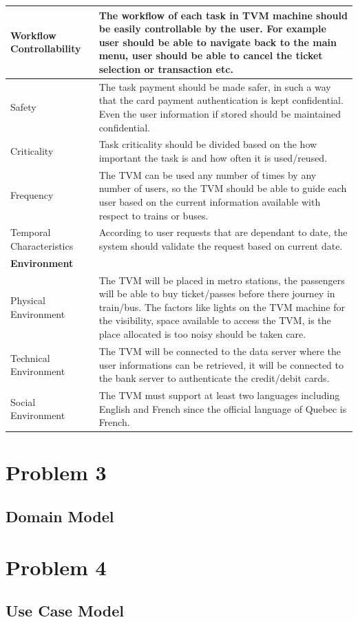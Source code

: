 \documentclass[a4paper,12pt]{report}
\begin{document}
\setlength{\tabcolsep}{18pt}
\renewcommand{\arraystretch}{1.5}
\begin{tabular}{ |p{3cm}|p{12cm}| }
	\hline
	Workflow Controllability & The workflow of each task in TVM machine should be easily controllable by the user. For example user should be able to navigate back to the main menu, user should be able to cancel the ticket selection or transaction etc.\\
	\hline
	Safety & 
	The task payment should be made safer, in such a way that the card payment authentication is kept confidential. Even the user information if stored should be maintained confidential.\\
	\hline
	Criticality & 
	Task criticality should be divided based on the how important the task is and how often it is used/reused.\\
	\hline
	Frequency & 
	The TVM can be used any number of times by any number of users, so the TVM should be able to guide each user based on the current information available with respect to trains or buses.\\
	\hline
	Temporal Characteristics & 
	According to user requests that are dependant to date, the system should validate the request based on current date. \\
	
	\hline
	\textbf{Environment} & \\
	\hline
	Physical Environment & 
	The TVM will be placed in metro stations, the passengers will be able to buy ticket/passes before there journey in train/bus. The factors like lights on the TVM machine for the visibility, space available to access the TVM, is the place allocated is too noisy should be taken care. \\
	\hline
	Technical Environment & 
	The TVM will be connected to the data server where the user informations can be retrieved, it will be connected to the bank server to authenticate the credit/debit cards. \\
	\hline
	Social Environment & 
	The TVM must support at least two languages including English and French since the official language of Quebec is French. \\
	\hline
\end{tabular}




\section{Problem 3}
\subsection{Domain Model}



\section{Problem 4}
\subsection{Use Case Model}








\printglossaries
\end{document}
